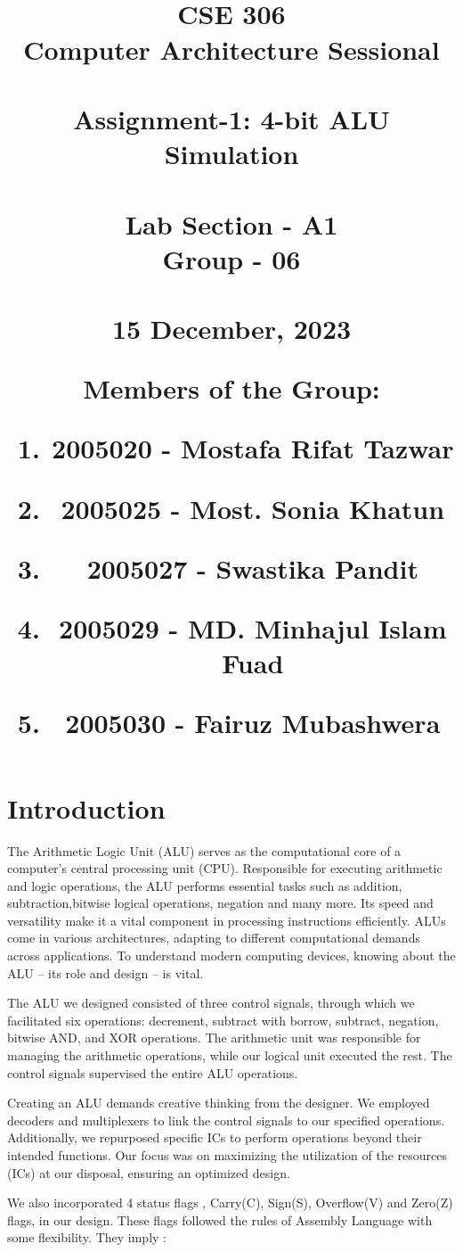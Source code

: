 \documentclass[18pt]{article}
\title{
\vspace{10mm}\\
CSE 306\\
Computer Architecture Sessional\\
\vspace{10mm}\\
Assignment-1: 4-bit ALU Simulation\\
\vspace{15mm}\\
Lab Section - A1\\
Group - 06\\
\vspace{5mm}\\
\large{15 December, 2023}\\
\vspace{20mm}
\raggedright
\Large{Members of the Group:\par}
\Large{
\begin{enumerate}[label = \roman*.]
    \item 2005020 - Mostafa Rifat Tazwar
    \item 2005025 - Most. Sonia Khatun
    \item 2005027 - Swastika Pandit
    \item 2005029 - MD. Minhajul Islam Fuad
    \item 2005030 - Fairuz Mubashwera
\end{enumerate}
}
}
\author{}
\date{}
\begin{document}
\maketitle

\newpage
\section{Introduction}
\large

The Arithmetic Logic Unit (ALU) serves as the computational core of a computer's central processing unit (CPU). Responsible for executing arithmetic and logic operations, the ALU performs essential tasks such as addition, subtraction,bitwise logical operations, negation and many more. Its speed and versatility make it a vital component in processing instructions efficiently. ALUs come in various architectures, adapting to different computational demands across applications. To understand modern computing devices, knowing about the ALU – its role and design – is vital.
\par
The ALU we designed consisted of three control signals, through which we facilitated six operations: decrement, subtract with borrow, 
subtract, negation, bitwise AND, and XOR operations. The arithmetic unit was responsible for managing the arithmetic operations, while our logical unit executed the 
rest. The control signals supervised the entire ALU operations.
\par
Creating an ALU demands creative thinking from the designer. We employed decoders and multiplexers to link the control signals to our specified operations. Additionally, we repurposed specific ICs to perform operations beyond their intended functions. Our focus was on maximizing the utilization of the resources (ICs) at our disposal, ensuring an optimized design.

\par
We also incorporated 4 status flags , Carry(C), Sign(S), Overflow(V) and Zero(Z) flags, in our design. These flags followed the rules of Assembly Language with some flexibility. They imply :
\vspace{5mm}
\end{document}
